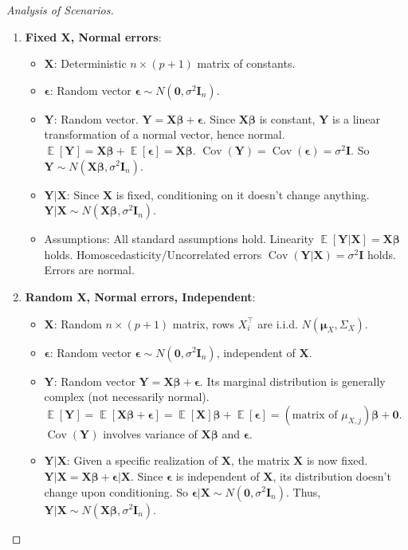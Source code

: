\documentclass[11pt, a4paper]{article}
\DeclareMathOperator{\E}{\mathbb{E}}             %
\DeclareMathOperator{\Cov}{\mathrm{Cov}}         %
\theoremstyle{definition}
\theoremstyle{remark}
\newcommand{\mat}[1]{\mathbf{#1}}       %
\newcommand{\vect}[1]{\bm{#1}}          %
\newcommand{\transpose}{^{\top}}        %
\begin{document}
\begin{proof}[Analysis of Scenarios]
\begin{enumerate}
    \item \textbf{Fixed X, Normal errors}:
        \begin{itemize}
            \item $\mat{X}$: Deterministic $n \times (p+1)$ matrix of constants.
            \item $\vect{\epsilon}$: Random vector $\vect{\epsilon} \sim N(\vect{0}, \sigma^2 \mat{I}_n)$.
            \item $\vect{Y}$: Random vector. $\vect{Y} = \mat{X}\vect{\beta} + \vect{\epsilon}$. Since $\mat{X}\vect{\beta}$ is constant, $\vect{Y}$ is a linear transformation of a normal vector, hence normal. $\E[\vect{Y}] = \mat{X}\vect{\beta} + \E[\vect{\epsilon}] = \mat{X}\vect{\beta}$. $\Cov(\vect{Y}) = \Cov(\vect{\epsilon}) = \sigma^2 \mat{I}$. So $\vect{Y} \sim N(\mat{X}\vect{\beta}, \sigma^2 \mat{I}_n)$.
            \item $\vect{Y}|\mat{X}$: Since $\mat{X}$ is fixed, conditioning on it doesn't change anything. $\vect{Y}|\mat{X} \sim N(\mat{X}\vect{\beta}, \sigma^2 \mat{I}_n)$.
            \item Assumptions: All standard assumptions hold. Linearity $\E[\vect{Y}|\mat{X}] = \mat{X}\vect{\beta}$ holds. Homoscedasticity/Uncorrelated errors $\Cov(\vect{Y}|\mat{X}) = \sigma^2 \mat{I}$ holds. Errors are normal.
        \end{itemize}
    \item \textbf{Random X, Normal errors, Independent}:
        \begin{itemize}
            \item $\mat{X}$: Random $n \times (p+1)$ matrix, rows $X_i\transpose$ are i.i.d. $N(\vect{\mu}_X, \Sigma_X)$.
            \item $\vect{\epsilon}$: Random vector $\vect{\epsilon} \sim N(\vect{0}, \sigma^2 \mat{I}_n)$, independent of $\mat{X}$.
            \item $\vect{Y}$: Random vector $\vect{Y} = \mat{X}\vect{\beta} + \vect{\epsilon}$. Its marginal distribution is generally complex (not necessarily normal). $\E[\vect{Y}] = \E[\mat{X}\vect{\beta} + \vect{\epsilon}] = \E[\mat{X}]\vect{\beta} + \E[\vect{\epsilon}] = (\text{matrix of } \mu_{X,j})\vect{\beta} + \vect{0}$. $\Cov(\vect{Y})$ involves variance of $\mat{X}\vect{\beta}$ and $\vect{\epsilon}$.
            \item $\vect{Y}|\mat{X}$: Given a specific realization of $\mat{X}$, the matrix $\mat{X}$ is now fixed. $\vect{Y}|\mat{X} = \mat{X}\vect{\beta} + \vect{\epsilon}|\mat{X}$. Since $\vect{\epsilon}$ is independent of $\mat{X}$, its distribution doesn't change upon conditioning. So $\vect{\epsilon}|\mat{X} \sim N(\vect{0}, \sigma^2 \mat{I}_n)$. Thus, $\vect{Y}|\mat{X} \sim N(\mat{X}\vect{\beta}, \sigma^2 \mat{I}_n)$.

\end{itemize}
\end{enumerate}
\end{proof}
\end{document}

